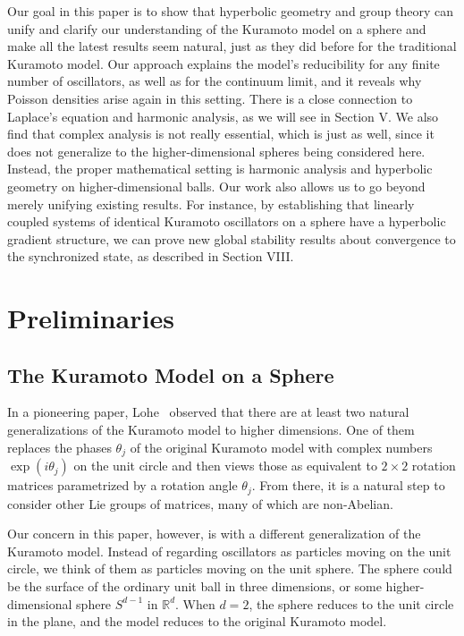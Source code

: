 \documentclass[%
 aip,
 amsmath,amssymb,
 reprint,%
]{revtex4-1}
\begin{document}
Our goal in this paper is to show that hyperbolic geometry and group theory can unify  and clarify our understanding of the Kuramoto model on a sphere and make all the latest results seem natural, just as they did before for the traditional Kuramoto model. Our approach  explains the model’s reducibility for any finite number of oscillators, as well as for the  continuum limit, and it reveals why Poisson densities arise again in this setting. There is a close  connection to Laplace’s equation and harmonic analysis, as we will see in Section V. We  also find that complex analysis is not really essential, which is just as well, since it does not  generalize to the higher-dimensional spheres being considered here. Instead, the proper  mathematical setting is harmonic analysis and hyperbolic geometry on higher-dimensional  balls. Our work also allows us to go beyond merely unifying existing results. For instance, by establishing that linearly coupled systems of identical Kuramoto oscillators on a sphere  have a hyperbolic gradient structure, we can prove new global stability results about convergence to the  synchronized state, as described in Section VIII. 


\section{\label{sec:level1}Preliminaries}
\subsection{\label{sec:level2}The Kuramoto Model on a Sphere}
In a pioneering paper, Lohe~\cite{lohe2009non} observed that there are at least two natural generalizations of the Kuramoto model to higher dimensions. One of them replaces the phases $\theta_j$ of the original Kuramoto model\cite{Kuramoto1975self,Kuramoto1984chemical} with complex numbers $\exp(i \theta_j)$ on the unit circle and then views those as equivalent to $2 \times 2$ rotation matrices parametrized by a rotation angle $\theta_j$. From there, it is a natural step to consider other Lie groups of matrices, many of which are non-Abelian.

Our concern in this paper, however, is with a different  generalization of the Kuramoto model. Instead of regarding oscillators as particles moving on the unit circle, we think of them as particles moving on the unit sphere. The sphere could be the surface of the ordinary unit ball in three dimensions, or some higher-dimensional sphere $S^{d-1}$ in $\mathbb{R}^d$. When $d=2$, the sphere reduces to the unit circle in the plane, and the model reduces to the original Kuramoto model.
\end{document}
